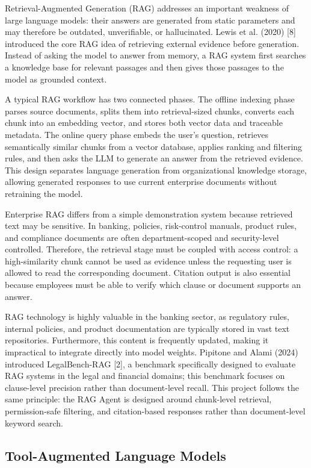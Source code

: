 Retrieval-Augmented Generation (RAG) addresses an important weakness of large language models: their answers are generated from static parameters and may therefore be outdated, unverifiable, or hallucinated. Lewis et al. (2020) [8] introduced the core RAG idea of retrieving external evidence before generation. Instead of asking the model to answer from memory, a RAG system first searches a knowledge base for relevant passages and then gives those passages to the model as grounded context.

A typical RAG workflow has two connected phases. The offline indexing phase parses source documents, splits them into retrieval-sized chunks, converts each chunk into an embedding vector, and stores both vector data and traceable metadata. The online query phase embeds the user's question, retrieves semantically similar chunks from a vector database, applies ranking and filtering rules, and then asks the LLM to generate an answer from the retrieved evidence. This design separates language generation from organizational knowledge storage, allowing generated responses to use current enterprise documents without retraining the model.

Enterprise RAG differs from a simple demonstration system because retrieved text may be sensitive. In banking, policies, risk-control manuals, product rules, and compliance documents are often department-scoped and security-level controlled. Therefore, the retrieval stage must be coupled with access control: a high-similarity chunk cannot be used as evidence unless the requesting user is allowed to read the corresponding document. Citation output is also essential because employees must be able to verify which clause or document supports an answer.

RAG technology is highly valuable in the banking sector, as regulatory rules, internal policies, and product documentation are typically stored in vast text repositories. Furthermore, this content is frequently updated, making it impractical to integrate directly into model weights. Pipitone and Alami (2024) introduced LegalBench-RAG [2], a benchmark specifically designed to evaluate RAG systems in the legal and financial domains; this benchmark focuses on clause-level precision rather than document-level recall. This project follows the same principle: the RAG Agent is designed around chunk-level retrieval, permission-safe filtering, and citation-based responses rather than document-level keyword search.

\subsection{Tool-Augmented Language Models}

